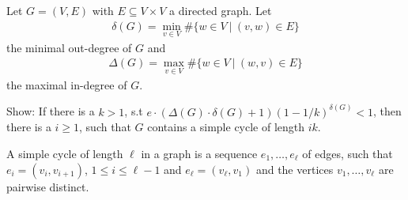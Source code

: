\begin{problem}
  Let $G=(V,E)$ with $E \subseteq V \times V$ a directed graph. Let
  \begin{align*}
    \delta(G) = \min\limits_{v \in V} \# \{w \in V \ | \ (v,w) \in E\} 
  \end{align*}
  the minimal out-degree of $G$ and
  \begin{align*}
    \Delta(G) = \max\limits_{v \in V} \# \{w \in V \ | \ (w,v) \in E\}
  \end{align*}
  the maximal in-degree of $G$.

  Show: If there is a $k>1$, s.t $e \cdot (\Delta(G) \cdot \delta(G) + 1)(1-1/k)^{\delta(G)} < 1$, then there is a $i \geq 1$, such that $G$ contains a simple cycle of length $ik$.

  A simple cycle of length $\ell$ in a graph is a sequence $e_{1}, \ldots, e_{\ell}$ of edges, such that $e_{i} = (v_{i}, v_{i+1})$, $1 \leq i \leq \ell-1$ and $e_{\ell} = (v_{\ell},v_{1})$ and the vertices $v_{1},\ldots, v_{\ell}$ are pairwise distinct.
\end{problem}
